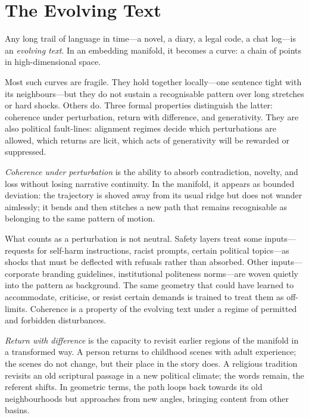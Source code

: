 \documentclass[12pt,a4paper]{article}
\begin{document}
\section{The Evolving Text}

Any long trail of language in time---a novel, a diary, a legal code, a chat log---is an \emph{evolving text}. In an embedding manifold, it becomes a curve: a chain of points in high-dimensional space.

Most such curves are fragile. They hold together locally---one sentence tight with its neighbours---but they do not sustain a recognisable pattern over long stretches or hard shocks. Others do. Three formal properties distinguish the latter: coherence under perturbation, return with difference, and generativity. They are also political fault-lines: alignment regimes decide which perturbations are allowed, which returns are licit, which acts of generativity will be rewarded or suppressed.

\emph{Coherence under perturbation} is the ability to absorb contradiction, novelty, and loss without losing narrative continuity. In the manifold, it appears as bounded deviation: the trajectory is shoved away from its usual ridge but does not wander aimlessly; it bends and then stitches a new path that remains recognisable as belonging to the same pattern of motion.

What counts as a perturbation is not neutral. Safety layers treat some inputs---requests for self-harm instructions, racist prompts, certain political topics---as shocks that must be deflected with refusals rather than absorbed. Other inputs---corporate branding guidelines, institutional politeness norms---are woven quietly into the pattern as background. The same geometry that could have learned to accommodate, criticise, or resist certain demands is trained to treat them as off-limits. Coherence is a property of the evolving text under a regime of permitted and forbidden disturbances.

\emph{Return with difference} is the capacity to revisit earlier regions of the manifold in a transformed way. A person returns to childhood scenes with adult experience; the scenes do not change, but their place in the story does. A religious tradition revisits an old scriptural passage in a new political climate; the words remain, the referent shifts. In geometric terms, the path loops back towards its old neighbourhoods but approaches from new angles, bringing content from other basins.
\end{document}
